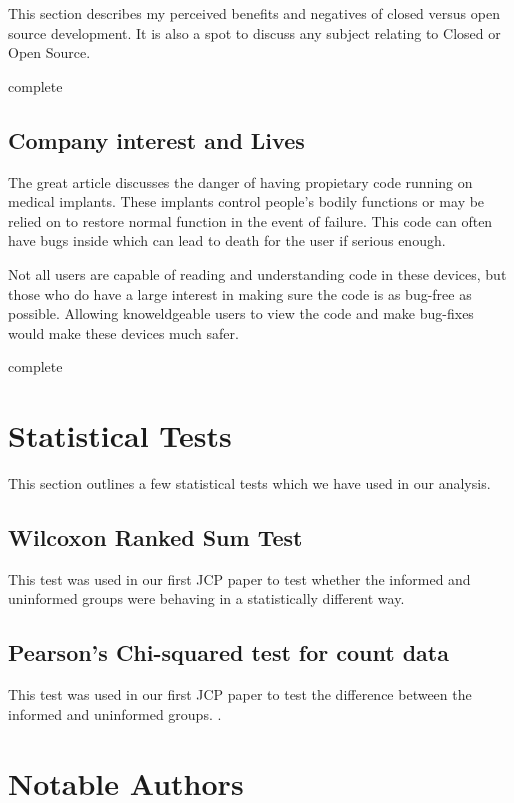 \documentclass[american]{article}
\newcommand{\complete}{
	\gls{complete}
}
\begin{document}
This section describes my perceived benefits and negatives of closed versus open source development. It is also a spot to discuss any subject relating to Closed or Open Source.

\complete

\subsection{Company interest and Lives}

The great article \cite{killed-by-code} discusses the danger of having propietary code running on medical implants. These implants control people's bodily functions or may be relied on to restore normal function in the event of failure. This code can often have bugs inside which can lead to death for the user if serious enough.

Not all users are capable of reading and understanding code in these devices, but those who do have a large interest in making sure the code is as bug-free as possible. Allowing knoweldgeable users to view the code and make bug-fixes would make these devices much safer.

\complete

\section{Statistical Tests}

This section outlines a few statistical tests which we have used in our analysis.

\subsection{Wilcoxon Ranked Sum Test}

This test was used in our first JCP paper to test whether the informed and uninformed groups were behaving in a statistically different way. \cite{doi:10.1080/01621459.1972.10481279,R-wilcoxon-test}

\subsection{Pearson's Chi-squared test for count data}

This test was used in our first JCP paper to test the difference between the informed and uninformed groups. \cite{10.2307/2984263,R-pearson-chisquare}.

\section{Notable Authors}
\end{document}
